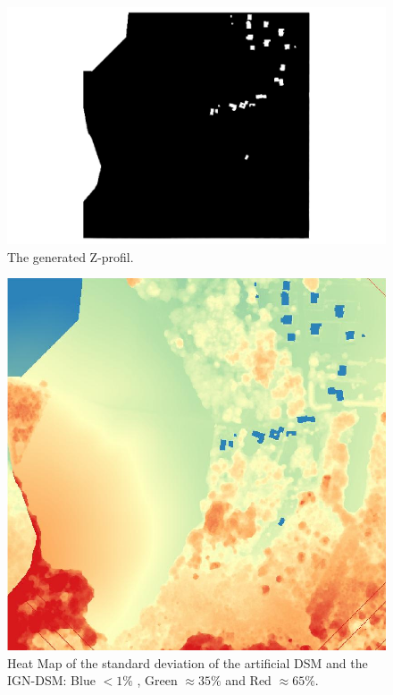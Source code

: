 \documentclass[a4paper, 11pt]{article}
\begin{document}
	\begin{figure}[H]
		\begin{center}
			\caption{\label{img::a_dsm} The generated Z-profil.}
			\includegraphics[scale=.4]{images/raster/elancourt/artificial_dsm.png}
		\end{center}
	\end{figure}
	\begin{figure}[H]
		\begin{center}
			\caption{\label{img::heatmap} Heat Map of the standard deviation of the artificial DSM and the IGN-DSM: Blue $< 1\%$ , Green $\approx 35\%$ and Red $\approx 65\%$.}
			\includegraphics[scale=.3]{images/raster/elancourt/heat_map.png}
		\end{center}
	\end{figure}
	
\end{document}
